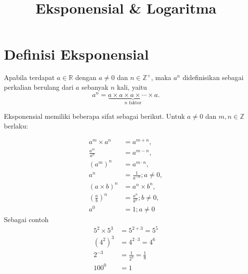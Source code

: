 \documentclass{article}
\title{\textbf{Eksponensial \& Logaritma}}
\begin{document}
\onehalfspacing

\maketitle

\section{Definisi Eksponensial}

Apabila terdapat $a \in \mathbb{R}$ dengan $a \neq 0$ dan $n \in \mathbb{Z}^+$, maka $a^n$ didefinisikan sebagai perkalian berulang dari $a$ sebanyak $n$ kali, yaitu
\[
a^n = \underbrace{a \times a \times a \times \cdots \times a}_{n\text{ faktor}}.
\]

Eksponensial memiliki beberapa sifat sebagai berikut. Untuk $a \neq 0$ dan $m,n \in \mathbb{Z}$ berlaku:

\[
\begin{aligned}
a^m \times a^n &= a^{m+n},\\
\frac{a^m}{a^n} &= a^{m-n},\\
(a^m)^n &= a^{m \cdot n},\\
a^n &= \frac{1}{a^{-n}};a \not= 0,\\
(a \times b)^n &=a^n \times b^n ,\\
\left( \frac{a}{b}\right)^n &= \frac{a^n}{b^n};b\not=0,\\
a^0 &= 1;a \not=0
\end{aligned}
\]
Sebagai contoh
\[
\begin{aligned}
    5^2 \times 5^3 &= 5^{2+3} =5^5\\
    (4^2)^3 &= 4^{2 \cdot 3} =4^6\\
    2^{-3} &= \frac{1}{2^3} = \frac{1}{8}\\
    100^0 &= 1
\end{aligned}
\]
\end{document}
